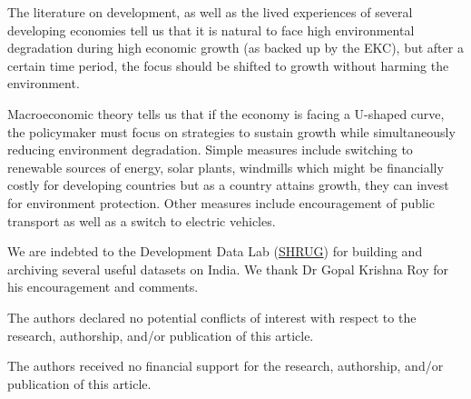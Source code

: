 \documentclass[doublespace,times,Afour,review]{template/sagej}
\begin{document}
The literature on development, as well as the lived experiences of several developing economies tell us that it is natural to face high environmental degradation during high economic growth (as backed up by the EKC), but after a certain time period, the focus should be shifted to growth without harming the environment. 

Macroeconomic theory tells us that if the economy is facing a U-shaped curve, the policymaker must focus on strategies to sustain growth while simultaneously reducing environment degradation. Simple measures include switching to renewable sources of energy, solar plants, windmills which might be financially costly for developing countries but as a country attains growth, they can invest for environment protection. Other measures include encouragement of public transport as well as a switch to electric vehicles.




\begin{acks}
We are indebted to the Development Data Lab (\hyperlink{https://www.devdatalab.org}{SHRUG}) for building and archiving several useful datasets on India. We thank Dr Gopal Krishna Roy for his encouragement and comments.
\end{acks}

\begin{dci}
The authors declared no potential conflicts of interest with respect to the research, authorship, and/or publication of this article.
\end{dci}

\begin{funding}
The authors received no financial support for the research, authorship, and/or publication of this article.
\end{funding}




\theendnotes
\end{document}
